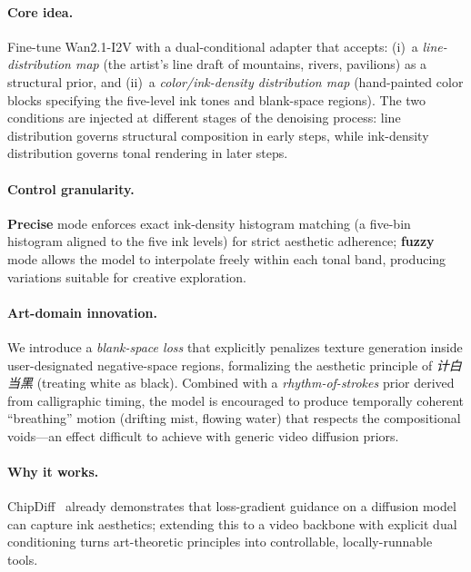 \paragraph{Core idea.} Fine-tune Wan2.1-I2V with a dual-conditional adapter that
accepts:
(i)~a \emph{line-distribution map} (the artist's line draft of mountains, rivers,
pavilions) as a structural prior, and
(ii)~a \emph{color/ink-density distribution map} (hand-painted color blocks specifying
the five-level ink tones and blank-space regions). The two conditions are injected at
different stages of the denoising process: line distribution governs structural
composition in early steps, while ink-density distribution governs tonal rendering in
later steps.

\paragraph{Control granularity.} \textbf{Precise} mode enforces exact ink-density
histogram matching (a five-bin histogram aligned to the five ink levels) for strict
aesthetic adherence; \textbf{fuzzy} mode allows the model to interpolate freely within
each tonal band, producing variations suitable for creative exploration.

\paragraph{Art-domain innovation.} We introduce a \emph{blank-space loss} that explicitly
penalizes texture generation inside user-designated negative-space regions, formalizing
the aesthetic principle of \emph{计白当黑} (treating white as black). Combined with a
\emph{rhythm-of-strokes} prior derived from calligraphic timing, the model is encouraged
to produce temporally coherent ``breathing'' motion (drifting mist, flowing water) that
respects the compositional voids---an effect difficult to achieve with generic video
diffusion priors.

\paragraph{Why it works.} ChipDiff~\cite{liu2026chipdiff} already demonstrates that
loss-gradient guidance on a diffusion model can capture ink aesthetics; extending this
to a video backbone with explicit dual conditioning turns art-theoretic principles into
controllable, locally-runnable tools.

